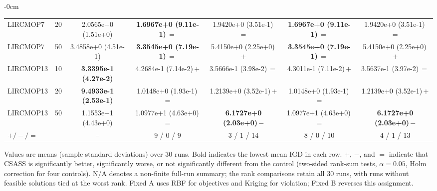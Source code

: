 \begin{table}[!htbp]
\begin{ROneBlock}
\begin{adjustwidth}{-\extralength}{0cm}
\begin{tabular*}{\linewidth}{@{\extracolsep{\fill}}lcccccc@{}}
LIRCMOP7 & 20 & 2.0565e+0 (1.51e+0) & \textbf{1.6967e+0 (9.11e-1)}\,$=$ & 1.9420e+0 (3.51e-1)\,$=$ & \textbf{1.6967e+0 (9.11e-1)}\,$=$ & 1.9420e+0 (3.51e-1)\,$=$ \\
LIRCMOP7 & 50 & 3.4858e+0 (4.51e-1) & \textbf{3.3545e+0 (7.19e-1)}\,$=$ & 5.4150e+0 (2.25e+0)\,$+$ & \textbf{3.3545e+0 (7.19e-1)}\,$=$ & 5.4150e+0 (2.25e+0)\,$+$ \\
LIRCMOP13 & 10 & \textbf{3.3395e-1 (4.27e-2)} & 4.2684e-1 (7.14e-2)\,$+$ & 3.5666e-1 (3.98e-2)\,$=$ & 4.3011e-1 (7.11e-2)\,$+$ & 3.5637e-1 (3.97e-2)\,$=$ \\
LIRCMOP13 & 20 & \textbf{9.4933e-1 (2.53e-1)} & 1.0148e+0 (1.93e-1)\,$=$ & 1.2139e+0 (3.52e-1)\,$+$ & 1.0148e+0 (1.93e-1)\,$=$ & 1.2139e+0 (3.52e-1)\,$+$ \\
LIRCMOP13 & 50 & 1.1553e+1 (4.43e+0) & 1.0977e+1 (4.63e+0)\,$=$ & \textbf{6.1727e+0 (2.03e+0)}\,$-$ & 1.0977e+1 (4.63e+0)\,$=$ & \textbf{6.1727e+0 (2.03e+0)}\,$-$ \\
\midrule
$+/-/=$ &  & -- & 9 / 0 / 9 & 3 / 1 / 14 & 8 / 0 / 10 & 4 / 1 / 13 \\
\bottomrule
\end{tabular*}
\vspace{4pt}
\parbox{\linewidth}{\footnotesize Values are means (sample standard deviations) over 30 runs. Bold indicates the lowest mean IGD in each row. $+$, $-$, and $=$ indicate that CSASS is significantly better, significantly worse, or not significantly different from the control (two-sided rank-sum tests, $\alpha=0.05$, Holm correction for four controls). N/A denotes a non-finite full-run summary; the rank comparisons retain all 30 runs, with runs without feasible solutions tied at the worst rank. Fixed A uses RBF for objectives and Kriging for violation; Fixed B reverses this assignment.}
\end{adjustwidth}
\end{ROneBlock}
\end{table}

